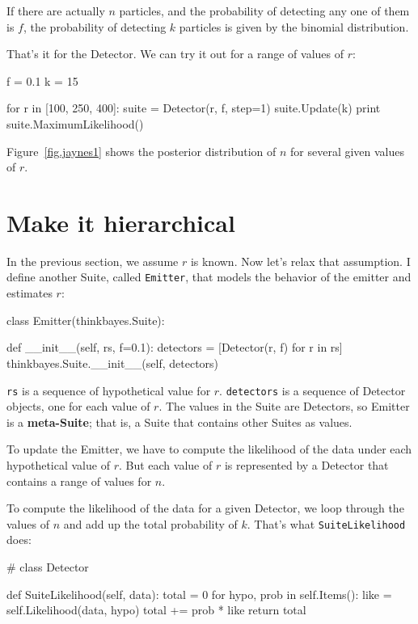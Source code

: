 \documentclass[12pt]{book}
\theoremstyle{exercise}
\newcommand{\py}[1]{{\tt #1}}%
\begin{document}
If there are actually $n$ particles, and the probability of detecting
any one of them is $f$, the probability of detecting $k$ particles is
given by the binomial distribution.

That's it for the Detector.  We can try it out for a range
of values of $r$:

\begin{code}
    f = 0.1
    k = 15

    for r in [100, 250, 400]:
        suite = Detector(r, f, step=1)
        suite.Update(k)
        print suite.MaximumLikelihood()
\end{code}

Figure~\ref{fig.jaynes1} shows the posterior distribution of $n$ for
several given values of $r$.


\section{Make it hierarchical}

In the previous section, we assume $r$ is known.  Now let's
relax that assumption.  I define another Suite, called \py{Emitter},
that models the behavior of the emitter and estimates $r$:

\begin{code}
class Emitter(thinkbayes.Suite):

    def __init__(self, rs, f=0.1):
        detectors = [Detector(r, f) for r in rs]
        thinkbayes.Suite.__init__(self, detectors)
\end{code}

\py{rs} is a sequence of hypothetical value for $r$.  \py{detectors}
is a sequence of Detector objects, one for each value of $r$.  The
values in the Suite are Detectors, so Emitter is a {\bf meta-Suite};
that is, a Suite that contains other Suites as values.

To update the Emitter, we have to compute the likelihood of the data
under each hypothetical value of $r$.  But each value of $r$ is
represented by a Detector that contains a range of values for $n$.

To compute the likelihood of the data for a given Detector, we loop
through the values of $n$ and add up the total probability of $k$.
That's what \py{SuiteLikelihood} does:

\begin{code}
# class Detector

    def SuiteLikelihood(self, data):
        total = 0
        for hypo, prob in self.Items():
            like = self.Likelihood(data, hypo)
            total += prob * like
        return total
\end{code}
\end{document}

